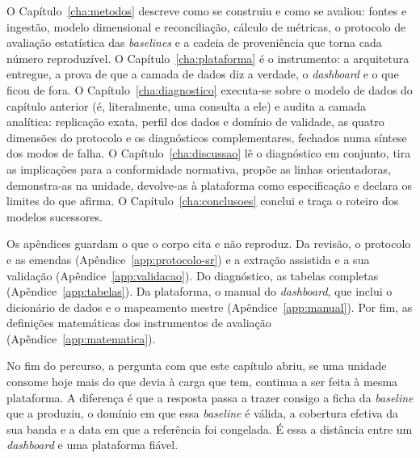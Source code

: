 O Capítulo~\ref{cha:metodos} descreve como se construiu e como se
avaliou: fontes e ingestão, modelo dimensional e reconciliação, cálculo
de métricas, o protocolo de avaliação estatística das \emph{baselines}
e a cadeia de proveniência que torna cada número reproduzível. O
Capítulo~\ref{cha:plataforma} é o instrumento: a arquitetura entregue,
a prova de que a camada de dados diz a verdade, o \emph{dashboard} e o
que ficou de fora. O Capítulo~\ref{cha:diagnostico} executa-se sobre o
modelo de dados do capítulo anterior (é, literalmente, uma consulta a
ele) e audita a camada analítica: replicação exata, perfil dos dados e
domínio de validade, as quatro dimensões do protocolo e os diagnósticos
complementares, fechados numa síntese dos modos de falha. O
Capítulo~\ref{cha:discussao} lê o diagnóstico em conjunto, tira as
implicações para a conformidade normativa, propõe as linhas
orientadoras, demonstra-as na unidade, devolve-as à plataforma como
especificação e declara os limites do que afirma. O
Capítulo~\ref{cha:conclusoes} conclui e traça o roteiro dos modelos
sucessores.


Os apêndices guardam o que o corpo cita e não reproduz. Da revisão, o
protocolo e as emendas (Apêndice~\ref{app:protocolo-sr}) e a extração
assistida e a sua validação (Apêndice~\ref{app:validacao}). Do diagnóstico,
as tabelas completas (Apêndice~\ref{app:tabelas}). Da plataforma, o manual
do \emph{dashboard}, que inclui o dicionário de dados e o mapeamento mestre
(Apêndice~\ref{app:manual}). Por fim, as definições matemáticas dos
instrumentos de avaliação (Apêndice~\ref{app:matematica}).

No fim do percurso, a pergunta com que este capítulo abriu, se uma
unidade consome hoje mais do que devia à carga que tem, continua a ser
feita à mesma plataforma. A diferença é que a resposta passa a
trazer consigo a ficha da \emph{baseline} que a produziu, o domínio em
que essa \emph{baseline} é válida, a cobertura efetiva da sua banda e a
data em que a referência foi congelada. É essa a distância entre um
\emph{dashboard} e uma plataforma fiável.
